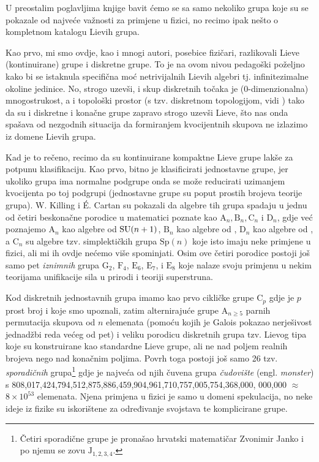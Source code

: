 U preostalim poglavljima knjige bavit ćemo se sa samo nekoliko grupa
koje su se pokazale od najveće važnosti za primjene u fizici, no recimo
ipak nešto o kompletnom katalogu Lievih grupa.

Kao prvo, mi smo ovdje, kao i mnogi autori, posebice fizičari, razlikovali
Lieve (kontinuirane) grupe i diskretne grupe. To je na ovom nivou pedagoški
poželjno kako bi se istaknula specifična moć netrivijalnih Lievih algebri tj. infinitezimalne
okoline jedinice. No, strogo uzevši, i skup diskretnih točaka je
(0-dimenzionalna) mnogostrukost, a i topološki prostor (s tzv. 
diskretnom topologijom, vidi \cite{Smolic:2024}) tako da su i diskretne
i konačne grupe zapravo strogo uzevši Lieve, što nas onda spašava od
nezgodnih situacija da formiranjem kvocijentnih skupova ne izlazimo
iz domene Lievih grupa.

Kad je to rečeno, recimo da su kontinuirane kompaktne Lieve grupe
lakše za potpunu klasifikaciju. Kao prvo,
bitno je klasificirati jednostavne grupe, jer ukoliko grupa ima normalne
podgrupe onda se može reducirati uzimanjem kvocijenta po toj podgrupi
(jednostavne grupe su poput prostih brojeva teorije grupa). W. Killing i \'{E}. Cartan
su pokazali da algebre tih grupa spadaju u jednu od četiri beskonačne 
porodice u matematici poznate kao $\mathrm{A}_n, \mathrm{B}_n, \mathrm{C}_n$
i $\mathrm{D}_n$, gdje već poznajemo
$\mathrm{A}_n$ kao algebre od $\mathrm{SU}(n+1)$,  $\mathrm{B}_n$ kao algebre od ,
$\mathrm{D}_n$ kao algebre od , a $\mathrm{C}_n$ su algebre tzv. simplektičkih grupa
$\mathrm{Sp}(n)$ koje isto imaju neke primjene u fizici, ali mi ih ovdje
nećemo više spominjati. Osim ove četiri porodice postoji još samo
pet \emph{iznimnih} grupa $\mathrm{G}_2$, $\mathrm{F}_4$,
$\mathrm{E}_6$, $\mathrm{E}_7$, i $\mathrm{E}_8$ koje nalaze svoju primjenu
u nekim teorijama unifikacije sila u prirodi i teoriji superstruna.

Kod diskretnih jednostavnih grupa imamo kao prvo cikličke grupe $\mathrm{C}_{p}$
gdje je $p$ prost broj i koje smo upoznali, 
zatim alternirajuće grupe $\mathrm{A}_{n\ge 5}$ parnih permutacija skupova
od $n$ elemenata (pomoću kojih je Galois pokazao nerješivost jednadžbi
reda većeg od pet) i
veliku porodicu diskretnih grupa tzv. Lievog tipa koje su konstruirane
kao standardne Lieve grupe, ali ne nad poljem realnih brojeva nego
nad konačnim poljima. Povrh toga postoji još samo 26 tzv. \emph{sporadičnih}
grupa\footnote{Četiri sporadične grupe je pronašao hrvatski matematičar Zvonimir Janko
i po njemu se zovu $\mathrm{J}_{1, 2, 3, 4}$.} gdje je najveća od njih
čuvena grupa \emph{čudovište} (engl. \emph{monster}) s
808,017,424,794,512,875,886,459,904,961,710,757,005,754,368,000, 000,000
 $\approx$ $8\times 10^{53}$
elemenata. Njena primjena u fizici je samo u domeni spekulacija, no
neke ideje iz fizike su iskorištene za određivanje svojstava te komplicirane
grupe.




